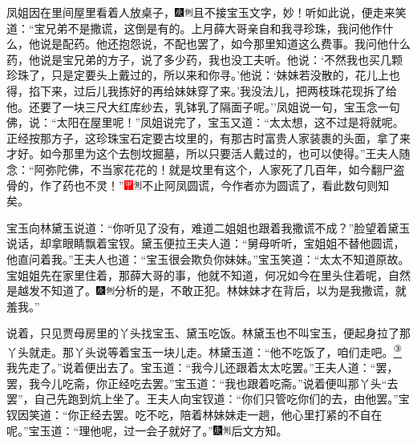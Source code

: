 凤姐因在里间屋里看着人放桌子，{\includegraphics[width=3mm]{../Images/00004}\includegraphics[width=3mm]{../Images/00011}\footnotesize \kaishu 且不接宝玉文字，妙！}听如此说，便走来笑道：``宝兄弟不是撒谎，这倒是有的。上月薛大哥亲自和我寻珍珠，我问他作什么，他说是配药。他还抱怨说，不配也罢了，如今那里知道这么费事。我问他什么药，他说是宝兄弟的方子，说了多少药，我也没工夫听。他说：`不然我也买几颗珍珠了，只是定要头上戴过的，所以来和你寻。'他说：`妹妹若没散的，花儿上也得，掐下来，过后儿我拣好的再给妹妹穿了来。'我没法儿，把两枝珠花现拆了给他。还要了一块三尺大红库纱去，乳钵乳了隔面子呢。''凤姐说一句，宝玉念一句佛，说：``太阳在屋里呢！''凤姐说完了，宝玉又道：``太太想，这不过是将就呢。正经按那方子，这珍珠宝石定要古坟里的，有那古时富贵人家装裹的头面，拿了来才好。如今那里为这个去刨坟掘墓，所以只要活人戴过的，也可以使得。''王夫人随念：``阿弥陀佛，不当家花花的！就是坟里有这个，人家死了几百年，如今翻尸盗骨的，作了药也不灵！''{\includegraphics[width=3mm]{../Images/00002}\includegraphics[width=3mm]{../Images/00011}\footnotesize \kaishu 不止阿凤圆谎，今作者亦为圆谎了，看此数句则知矣。}

宝玉向林黛玉说道：``你听见了没有，难道二姐姐也跟着我撒谎不成？''脸望着黛玉说话，却拿眼睛飘着宝钗。黛玉便拉王夫人道：``舅母听听，宝姐姐不替他圆谎，他直问着我。''王夫人也道：``宝玉很会欺负你妹妹。''宝玉笑道：``太太不知道原故。宝姐姐先在家里住着，那薛大哥的事，他就不知道，何况如今在里头住着呢，自然是越发不知道了。{\includegraphics[width=3mm]{../Images/00004}\includegraphics[width=3mm]{../Images/00011}\footnotesize \kaishu 分析的是，不敢正犯。}林妹妹才在背后，以为是我撒谎，就羞我。''

说着，只见贾母房里的丫头找宝玉、黛玉吃饭。林黛玉也不叫宝玉，便起身拉了那丫头就走。那丫头说等着宝玉一块儿走。林黛玉道：``他不吃饭了，咱们走吧。\href{../Text/part0032_split_000.html\#lnkback_3_a}{\textsuperscript{③}}我先走了。''说着便出去了。宝玉道：``我今儿还跟着太太吃罢。''王夫人道：``罢，罢，我今儿吃斋，你正经吃去罢。''宝玉道：``我也跟着吃斋。''说着便叫那丫头``去罢''，自己先跑到炕上坐了。王夫人向宝钗道：``你们只管吃你们的去，由他罢。''宝钗因笑道：``你正经去罢。吃不吃，陪着林妹妹走一趟，他心里打紧的不自在呢。''宝玉道：``理他呢，过一会子就好了。''{\includegraphics[width=3mm]{../Images/00004}\includegraphics[width=3mm]{../Images/00011}\footnotesize \kaishu 后文方知。}

